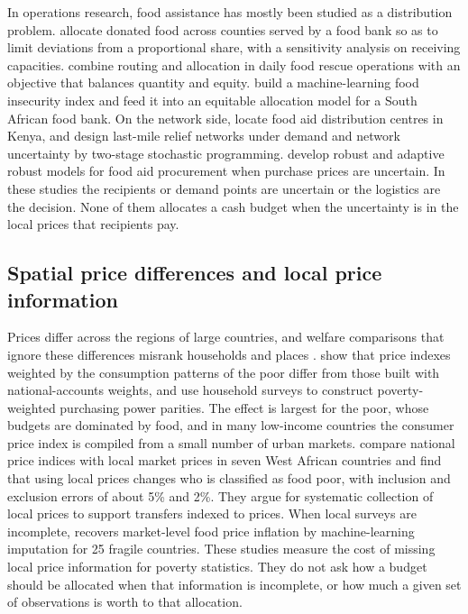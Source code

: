 \documentclass[preprint,12pt,number]{elsarticle}%
\theoremstyle{definition}
\theoremstyle{remark}
\begin{document}
In operations research, food assistance has mostly been studied as a distribution problem. \citet{orgut2016modeling} allocate donated food across counties served by a food bank so as to limit deviations from a proportional share, with a sensitivity analysis on receiving capacities. \citet{eisenhandler2019humanitarian} combine routing and allocation in daily food rescue operations with an objective that balances quantity and equity. \citet{dawood2026fima} build a machine-learning food insecurity index and feed it into an equitable allocation model for a South African food bank. On the network side, \citet{rancourt2015tactical} locate food aid distribution centres in Kenya, and \citet{noyan2016stochastic} design last-mile relief networks under demand and network uncertainty by two-stage stochastic programming. \citet{demoor2024robust} develop robust and adaptive robust models for food aid procurement when purchase prices are uncertain. In these studies the recipients or demand points are uncertain or the logistics are the decision. None of them allocates a cash budget when the uncertainty is in the local prices that recipients pay.

\subsection{Spatial price differences and local price information}

Prices differ across the regions of large countries, and welfare comparisons that ignore these differences misrank households and places \citep{deaton1997analysis,deaton2011spatial}. \citet{deaton2011ppp} show that price indexes weighted by the consumption patterns of the poor differ from those built with national-accounts weights, and use household surveys to construct poverty-weighted purchasing power parities. The effect is largest for the poor, whose budgets are dominated by food, and in many low-income countries the consumer price index is compiled from a small number of urban markets. \citet{dietrich2023lost} compare national price indices with local market prices in seven West African countries and find that using local prices changes who is classified as food poor, with inclusion and exclusion errors of about 5\% and 2\%. They argue for systematic collection of local prices to support transfers indexed to prices. When local surveys are incomplete, \citet{andree2021estimating} recovers market-level food price inflation by machine-learning imputation for 25 fragile countries. These studies measure the cost of missing local price information for poverty statistics. They do not ask how a budget should be allocated when that information is incomplete, or how much a given set of observations is worth to that allocation.
\end{document}

